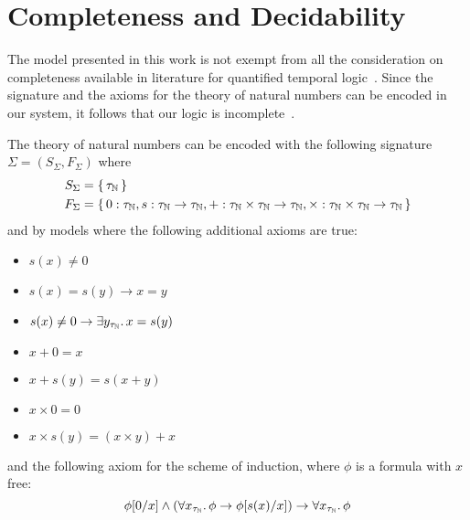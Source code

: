 \section{Completeness and Decidability}
The model presented in this work is not exempt from all the consideration on completeness available in literature for
quantified temporal logic~\cite{merz_decidability_1992}. Since the signature and the axioms for the theory of natural
numbers can be encoded in our system, it follows that our logic is
incomplete~\cite{barwise_incompleteness_1977,tarski_undecidable_1953}.
\begin{example}
  The theory of natural numbers can be encoded with the following signature $\Sigma = (S_\Sigma, F_\Sigma)$ where
  \[
    \begin{split}
      S_\Sigma &= \set{\tau_\mathbb{N}} \\
      F_\Sigma &= \set{0 : \tau_\mathbb{N}, s : \tau_\mathbb{N} \to \tau_\mathbb{N}, + : \tau_\mathbb{N} \times
      \tau_\mathbb{N} \to \tau_\mathbb{N}, \times : \tau_\mathbb{N} \times \tau_\mathbb{N} \to \tau_\mathbb{N}}
    \end{split}
  \]
  and by models where the following additional axioms are true:
  \begin{itemize}
    \item $s(x) \neq 0$
    \item $s(x) = s(y) \to x = y$
    \item $s(x) \neq 0 \to \exists {y_{\tau_\mathbb{N}}} \ldotp {x = s(y)}$
    \item $x + 0 = x$
    \item $x + s(y) = s(x + y)$
    \item $x \times 0 = 0$
    \item $x \times s(y) = (x \times y) + x$
  \end{itemize}
  and the following axiom for the scheme of induction, where $\phi$ is a formula with $x$ free:
  \[
    \phi[0/x] \land (\forall {x_{\tau_\mathbb{N}}} \ldotp {\phi \to \phi[s(x)/x]}) \to \forall {x_{\tau_\mathbb{N}}} \ldotp {\phi}
  \]
\end{example}

